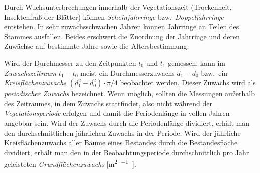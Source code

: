 \documentclass[twocolumn, paper=a4, fontsize=10pt]{scrartcl}
\begin{document}
Durch Wuchsunterbrechungen innerhalb der Vegetationszeit (Trockenheit, Insektenfraß der Blätter) können \emph{Scheinjahrringe} bzw.\ \emph{Doppeljahrringe} entstehen. In sehr zuwachsschwachen Jahren können Jahrringe an Teilen des Stammes ausfallen. Beides erschwert die Zuordnung der Jahrringe und deren Zuwächse auf bestimmte Jahre sowie die Altersbestimmung.

Wird der Durchmesser zu den Zeitpunkten $t_0$ und $t_1$ gemessen, kann im \emph{Zuwachszeitraum} $t_1 - t_0$ meist ein Durchmesserzuwachs $d_1 - d_0$ bzw.\ ein \emph{Kreisflächenzuwachs} $(d_1^2 - d_0^2)\cdot \pi/4$ beobachtet werden. Dieser Zuwachs wird als \emph{periodischer Zuwachs} bezeichnet. Wenn möglich, sollten die Messungen außerhalb des Zeitraumes, in dem Zuwachs stattfindet, also nicht während der \emph{Vegetationsperiode} erfolgen und damit die Periodenlänge in vollen Jahren angebbar sein. Wird der Zuwachs durch die Periodenlänge dividiert, erhält man den durchschnittlichen jährlichen Zuwachs in der Periode. Wird der jährliche Kreisflächenzuwachs aller Bäume eines Bestandes durch die Bestandesfläche dividiert, erhält man den in der Beobachtungsperiode durchschnittlich pro Jahr geleisteten \emph{Grundflächenzuwachs} [\unit{\meter\squared\per\ha\Jahr}].
\end{document}
